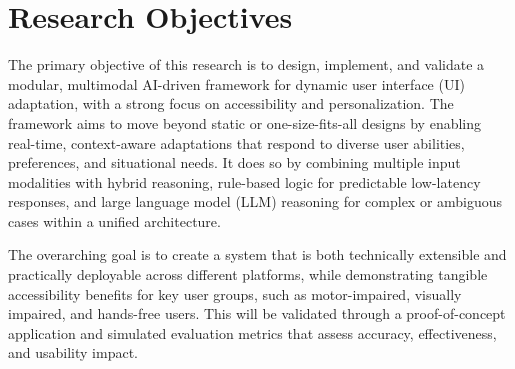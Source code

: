 \newpage

\section{Research Objectives}

The primary objective of this research is to design, implement, and validate a modular, multimodal AI-driven framework for dynamic user interface (UI) adaptation, with a strong focus on accessibility and personalization. The framework aims to move beyond static or one-size-fits-all designs by enabling real-time, context-aware adaptations that respond to diverse user abilities, preferences, and situational needs. It does so by combining multiple input modalities with hybrid reasoning, rule-based logic for predictable low-latency responses, and large language model (LLM) reasoning for complex or ambiguous cases within a unified architecture.  

The overarching goal is to create a system that is both technically extensible and practically deployable across different platforms, while demonstrating tangible accessibility benefits for key user groups, such as motor-impaired, visually impaired, and hands-free users. This will be validated through a proof-of-concept application and simulated evaluation metrics that assess accuracy, effectiveness, and usability impact.

